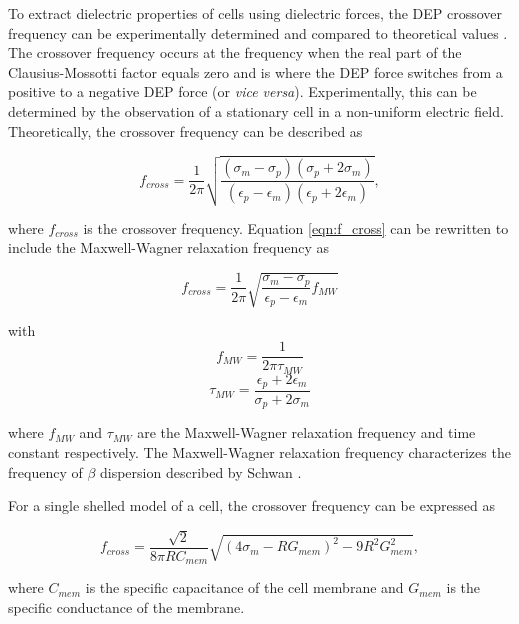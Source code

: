  \par To extract dielectric properties of cells using dielectric forces, the DEP crossover frequency can be experimentally determined and compared to theoretical values \cite{morgan_single_2007}. The crossover frequency occurs at the frequency when the real part of the Clausius-Mossotti factor equals zero and is where the DEP force switches from a positive to a negative DEP force (or \textit{vice versa}). Experimentally, this can be determined by the observation of a stationary cell in a non-uniform electric field. Theoretically, the crossover frequency can be described as
 
 \begin{equation}
     f_{cross} = \frac{1}{2 \pi}\sqrt{\frac{(\sigma_m-\sigma_p)(\sigma_p+2\sigma_m)}{(\epsilon_p-\epsilon_m)(\epsilon_p+2\epsilon_m)}},
     \label{eqn:f_cross}
 \end{equation}
  
 \noindent where $f_{cross}$ is the crossover frequency. Equation \ref{eqn:f_cross} can be rewritten to include the Maxwell-Wagner relaxation frequency as \cite{morgan_single_2007}
 
 \begin{equation}
    f_{cross} = \frac{1}{2 \pi} \sqrt{\frac{\sigma_m - \sigma_p}{\epsilon_p - \epsilon_m}f_{MW}}
 \end{equation}
 
 \noindent with
\begin{equation}
    f_{MW} = \frac{1}{2\pi\tau_{MW}} 
\end{equation}
\begin{equation}
    \tau_{MW} = \frac{\epsilon_p + 2\epsilon_m}{\sigma_p + 2\sigma_m}
\end{equation}
 
 \noindent where $f_{MW}$ and $\tau_{MW}$ are the Maxwell-Wagner relaxation frequency and time constant respectively. The Maxwell-Wagner relaxation frequency characterizes the frequency of $\beta$ dispersion described by Schwan \cite{morgan_single_2007}.
 
 \par For a single shelled model of a cell, the crossover frequency can be expressed as
 
 \begin{equation}
     f_{cross} = \frac{\sqrt{2}}{8\pi R C_{mem}}\sqrt{(4\sigma_m - RG_{mem})^2 - 9R^2G^2_{mem}},
 \end{equation}
 
 \noindent where $C_{mem}$ is the specific capacitance of the cell membrane and $G_{mem}$ is the specific conductance of the membrane.
 
